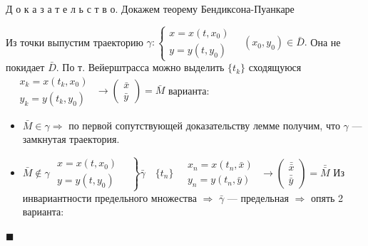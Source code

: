 \documentclass[oneside, final, 12pt]{article}
\theoremstyle{def}
\theoremstyle{th}
\theoremstyle{rem}
\renewenvironment{proof}{\par Д о к а з а т е л ь с т в о.}{\hfill$\blacksquare$}
\numberwithin{figure}{section}
\numberwithin{equation}{section}
\begin{document}
	\begin{proof}{ Докажем теорему Бендиксона-Пуанкаре} \vspace{3mm}
	
		Из точки выпустим траекторию $ \gamma: \left\{ \begin{gathered}
																				x = x(t, x_0) \\
																				y = y(t,y_0)
																			\end{gathered} \quad \right. (x_0, y_0) \in \bar{D}.
															$ Она не покидает $\bar{D}$.\vspace{3mm} \newline
		По т. Вейерштрасса можно выделить $\{t_k\}$ сходящуюся 
																			$\quad \begin{gathered}
																				x_k = x(t_k,x_0) \\
																				y_k = y(t_k,y_0)
																			\end{gathered} \,\, \rightarrow 
																			\begin{pmatrix} \bar{x}\\ \bar{y} \end{pmatrix} = \bar{M}
																			$  варианта:
		\begin{itemize}
			\item $\bar{M} \in \gamma \Rightarrow$ по первой сопутствующей доказательству лемме получим, что 
				$\gamma$ --- замкнутая траектория.
			\item  $\bar{M} \notin \gamma$ \newline
					$ \left. \begin{gathered}
										x = x(t, x_0) \\
										y = y(t,y_0)
									\end{gathered} \quad \right\} \bar{\gamma} \quad								 
								\{t_n\} \quad
								\begin{gathered}
									x_n = x(t_n,\bar{x}) \\
									y_n = y(t_n,\bar{y})
								\end{gathered} \,\, \rightarrow 
								\begin{pmatrix} \bar{\bar{x}}\\ \bar{\bar{y}} \end{pmatrix} = \bar{\bar{M}}
								$ \newline
				Из инвариантности предельного множества $\Rightarrow$ $\bar{\gamma}$ --- предельная 
					$\Rightarrow$ опять 2 варианта:
						\begin{itemize}

\end{itemize}
\end{itemize}
\end{proof}
\end{document}
